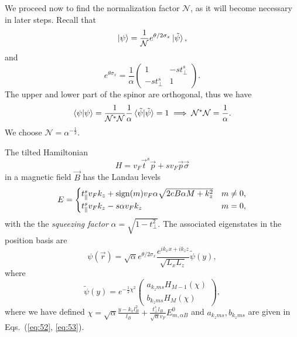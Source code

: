We proceed now to find the normalization factor \( \mathcal{N} \), as it will become necessary in later steps.
Recall that
\[
  \ket{\psi} = \frac{1}{\mathcal{N}} e^{\theta /2 \sigma _x} \ket{\tilde{\psi}},
\]
and
\[
e^{\theta \sigma _x} =
\frac{1}{\alpha }
\begin{pmatrix}
  1 & -s t_{\perp}^s\\
  -s t_{\perp}^s & 1
\end{pmatrix}.
\]
The upper and lower part of the spinor are orthogonal, thus we have
\begin{equation}
  \label{eq:54}
  \braket{\psi  | \psi } = \frac{1}{\mathcal{N}^{*} \mathcal{N}} \frac{1}{\alpha } \braket{\tilde{\psi}  | \tilde{\psi} } = 1 \implies \mathcal{N}^{*}\mathcal{N} = \frac{1}{\alpha }.
\end{equation}
We choose \( \mathcal{N} = \alpha^{-\frac{1}{2}} \).

\begin{summary}\label{summary:llevels}
The tilted Hamiltonian
  \[
    H = v_F \vec{t}^s \vec{p} + s v_F \vec{p} \vec{\sigma}
  \]
  in a magnetic field \( \vec{B} \) has the Landau levels
  \[
    E =
    \begin{cases}
      t^s_{\parallel} v_F k_z + \operatorname{sign}(m) v_F \alpha \sqrt{2 e B \alpha M + k_{z} ^2} & m \neq 0,\\
      t^s_{\parallel} v_F k_z - s \alpha v_F k_z & m = 0,
    \end{cases}
  \]
  with the the \emph{squeezing factor} \( \alpha = \sqrt{1 - t_{\perp} ^2}  \).
  The associated eigenstates in the position basis are
  \[
    \psi(\vec{r}) = \sqrt{\alpha} e^{\theta /2 \sigma_x}
    \frac{
      e^{ik_{x} x + ik_{z} z}
    }{
      \sqrt{L_{x}  L_z}
    } \tilde{\psi}(y),
    \]
    where
    \[
      \tilde{\psi} (y) = e^{-\frac{1}{2} \chi^2}
      \begin{pmatrix}
        a_{k_z m s} H_{M - 1} (\chi) \\
        b_{k_z m s} H_M (\chi)
      \end{pmatrix},
    \]
    where we have defined \( \chi = \sqrt{\alpha} \frac{ y - k_x l_B^2 }{l_{B}} + \frac{t_{\perp}^s l_B}{\sqrt{\alpha} v_{F}} E^0_{m, \alpha B} \) and \( a_{k_z m s}, b_{k_z m s} \) are given in Eqs.~(\ref{eq:52}, \ref{eq:53}).
\end{summary}
